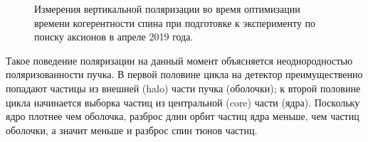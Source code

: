 \begin{figure}[h]\centering
	\caption{Измерения вертикальной поляризации во время оптимизации времени когерентности спина при подготовке к эксперименту по поиску аксионов в апреле 2019 года.\label{fig:April2019:Polarization}}
\end{figure}

Такое поведение поляризации на данный момент объясняется неоднородностью поляризованности пучка. В первой половине цикла на детектор преимущественно попадают частицы из внешней (halo) части пучка (оболочки); к второй половине цикла начинается выборка частиц из центральной (core) части (ядра). Поскольку ядро плотнее чем оболочка, разброс длин орбит частиц ядра меньше, чем частиц оболочки, а значит меньше и разброс спин тюнов частиц.

